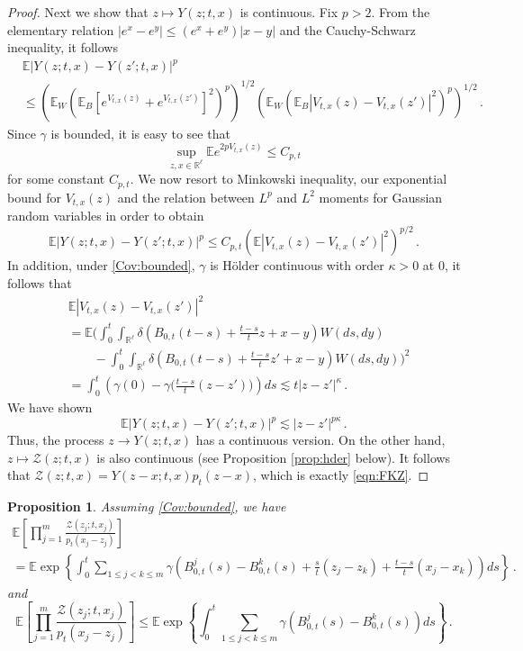 \documentclass[12pt,reqno]{amsart}
\newtheorem{proposition}[theorem]{Proposition}
\theoremstyle{remark}
\newcommand{\1}{\mathbf{1}}
\def\RR{\mathbb{R}}
\def\EE{\mathbb{E}}
\def\Z{\mathcal{Z}}
\begin{document}
\begin{proof}
		
		Next we show that $z\mapsto Y(z;t,x)$ is continuous. Fix $p>2$. From the elementary relation $|e^x-e^y| \leq (e^x + e^y)|x-y|$ and the Cauchy-Schwarz inequality, it follows 
		\begin{align*}
		&\EE \left| Y(z; t,x) - Y(z'; t,x) \right|^p\\
		 &\leq \left(\EE_W \left( \EE_B\left[e^{V_{t,x}(z)}+e^{V_{t,x}(z')}\right]^2 \right)^p\right)^{1/2} \left(\EE_W \left(\EE_B|V_{t,x}(z)-V_{t,x}(z')|^2\right)^p\right)^{1/2}\,.
		\end{align*}
		Since $\gamma$ is bounded, it is easy to see that
		\begin{equation*}
			\sup_{z,x\in\RR^\ell}\EE e^{2pV_{t,x}(z)}\le C_{p,t}
		\end{equation*}
		for some constant $C_{p,t}$.
		We now resort to Minkowski inequality, our exponential bound for $V_{t,x}(z)$ and the relation between $L^p$ and $L^2$ moments for Gaussian random variables in order to obtain 
		\begin{equation*}
			\EE \left| Y(z; t,x) - Y(z'; t,x) \right|^p \leq C_{p,t} \left( \EE|V_{t,x}(z)-V_{t,x}(z')|^2 \right)^{p/2}	\,.
		\end{equation*}
		In addition, under \ref{Cov:bounded}, $\gamma$ is H\"older continuous with order $\kappa >0$ at 0, it follows that
		 \begin{align*}
		 &\EE |V_{t,x}(z)-V_{t,x}(z')|^2\\
		 &= \EE \bigg(\int_0^t\int_{\RR^\ell}\delta(B_{0,t}(t-s)+\frac{t-s}t z+x-y)W(ds,dy)\\
		 &\quad \quad - \int_0^t\int_{\RR^\ell}\delta(B_{0,t}(t-s)+\frac{t-s}t z'+x-y)W(ds,dy) \bigg)^2\\
		 &= \int_0^t \left( \gamma(0) - \gamma\Big( \frac{t-s}{t} (z-z')\Big) \right)ds \lesssim t |z-z'|^{\kappa}\,.
		 \end{align*}	
		We have shown
		\begin{equation*}
			\EE \left| Y(z; t,x) - Y(z'; t,x) \right|^p \lesssim |z-z'|^{p \kappa}	\,.
		\end{equation*}
		Thus, the process $z\rightarrow Y(z;t,x)$  has a continuous version. On the other hand, $z\mapsto\Z(z;t,x)$ is also continuous (see Proposition \ref{prop:hder} below). It follows that
		$\Z(z;t,x)=Y(z-x;t,x) p_t(z-x)$, which is exactly \eqref{eqn:FKZ}.
	\end{proof}
	\begin{proposition}
		Assuming \ref{Cov:bounded}, we have
		\begin{multline}\label{h1:ZmFK}
			\EE\left[\prod_{j=1}^m \frac{\Z(z_j;t,x_j)}{p_t(x_j-z_j)} \right]
			\\=  
			\EE\exp\left\{\int_0^t\sum_{1\le j<k\le m} \gamma\left(B_{0,t}^j(s)-B_{0,t}^k(s)+\frac st(z_j-z_k) +\frac{t-s}t(x_j-x_k)\right)ds\right\}\,.
		\end{multline}
		and
		\begin{equation}\label{h1:supZm}
			\EE\left[\prod_{j=1}^m \frac{\Z(z_j;t,x_j)}{p_t(x_j-z_j)} \right]
			\le  
			\EE\exp\left\{\int_0^t\sum_{1\le j<k\le m} \gamma\left(B_{0,t}^j(s)-B_{0,t}^k(s)\right)ds\right\}\,.
		\end{equation}
	\end{proposition}
\end{document}
